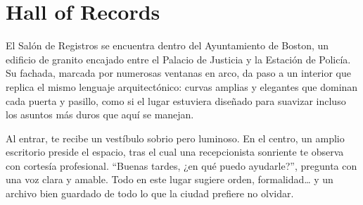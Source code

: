 \section{Hall of Records} 

El Salón de Registros se encuentra dentro del Ayuntamiento de Boston, un
edificio de granito encajado entre el Palacio de Justicia y la Estación de
Policía. Su fachada, marcada por numerosas ventanas en arco, da paso a un
interior que replica el mismo lenguaje arquitectónico: curvas amplias y
elegantes que dominan cada puerta y pasillo, como si el lugar estuviera
diseñado para suavizar incluso los asuntos más duros que aquí se manejan.

Al entrar, te recibe un vestíbulo sobrio pero luminoso. En el centro, un amplio
escritorio preside el espacio, tras el cual una recepcionista sonriente te
observa con cortesía profesional. “Buenas tardes, ¿en qué puedo ayudarle?”,
pregunta con una voz clara y amable. Todo en este lugar sugiere orden,
formalidad… y un archivo bien guardado de todo lo que la ciudad prefiere no
olvidar.
